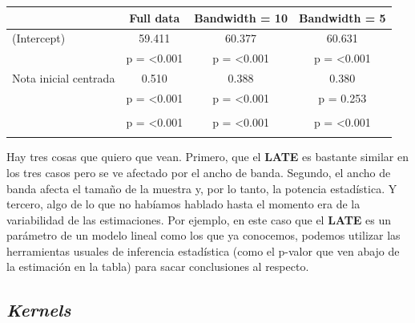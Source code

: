\documentclass[
  letterpaper,
  DIV=11,
  numbers=noendperiod,
  oneside]{scrreprt}
\begin{document}
\begin{table}
\fontsize{12.0pt}{14.4pt}\selectfont
\begin{tabular*}{\linewidth}{@{\extracolsep{\fill}}lccc}
\toprule
  & Full data & Bandwidth = 10 & Bandwidth = 5 \\ 
\midrule\addlinespace[2.5pt]
(Intercept) & 59.411 & 60.377 & 60.631 \\ 
 & p = <0.001 & p = <0.001 & p = <0.001 \\ 
Nota inicial centrada & 0.510 & 0.388 & 0.380 \\ 
 & p = <0.001 & p = <0.001 & p = 0.253 \\ 
{\bfseries \cellcolor[HTML]{rgba(255,255,224,0.8)}{\textcolor[HTML]{000000}{Participó en la tutoría}}} & {\bfseries \cellcolor[HTML]{rgba(255,255,224,0.8)}{\textcolor[HTML]{000000}{10.800}}} & {\bfseries \cellcolor[HTML]{rgba(255,255,224,0.8)}{\textcolor[HTML]{000000}{9.273}}} & {\bfseries \cellcolor[HTML]{rgba(255,255,224,0.8)}{\textcolor[HTML]{000000}{9.122}}} \\ 
{} & {p = <0.001} & {p = <0.001} & {p = <0.001} \\ 
{\bfseries \cellcolor[HTML]{rgba(255,255,224,0.8)}{\textcolor[HTML]{000000}{Num.Obs.}}} & {\bfseries \cellcolor[HTML]{rgba(255,255,224,0.8)}{\textcolor[HTML]{000000}{1000}}} & {\bfseries \cellcolor[HTML]{rgba(255,255,224,0.8)}{\textcolor[HTML]{000000}{404}}} & {\bfseries \cellcolor[HTML]{rgba(255,255,224,0.8)}{\textcolor[HTML]{000000}{194}}} \\ 
\bottomrule
\end{tabular*}
\end{table}

Hay tres cosas que quiero que vean. Primero, que el \textbf{LATE} es
bastante similar en los tres casos pero se ve afectado por el ancho de
banda. Segundo, el ancho de banda afecta el tamaño de la muestra y, por
lo tanto, la potencia estadística. Y tercero, algo de lo que no habíamos
hablado hasta el momento era de la variabilidad de las estimaciones. Por
ejemplo, en este caso que el \textbf{LATE} es un parámetro de un modelo
lineal como los que ya conocemos, podemos utilizar las herramientas
usuales de inferencia estadística (como el p-valor que ven abajo de la
estimación en la tabla) para sacar conclusiones al respecto.

\hypertarget{kernels}{%
\subsection{\texorpdfstring{\emph{Kernels}}{Kernels}}\label{kernels}}
\end{document}
